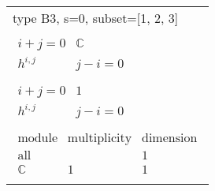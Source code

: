 \documentclass[crop,border=2mm]{standalone}
\begin{document}
\begin{tabular}{l}
{\huge type B3, s=0, subset=[1, 2, 3]}\\ \\


$\displaystyle
\begin{array}{r|l}
	{\scriptstyle i+j=0}&\mathbb{C}\\
	\hline h^{i,j}&{\scriptstyle j-i=0}
\end{array}
$ \\ \\


$\displaystyle
\begin{array}{r|l}
	{\scriptstyle i+j=0}&1\\
	\hline h^{i,j}&{\scriptstyle j-i=0}
\end{array}
$ \\ \\


$\displaystyle
\begin{array}{rll}
	\text{module}&\text{multiplicity}&\text{dimension} \\ \hline \text{all}&&1 \\
	\mathbb{C}&1&1
\end{array}
$ \\ \\

\end{tabular}
\end{document}
